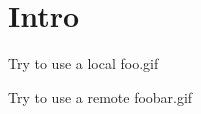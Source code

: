 \documentclass[epsf]{article}
\begin{document}
\section{Intro}

Try to use a local foo.gif

Try to use a remote foobar.gif
\end{document}
